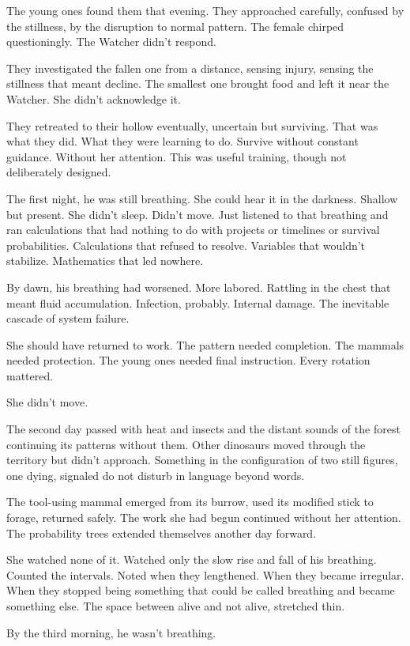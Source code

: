 The young ones found them that evening. They approached carefully, confused by the stillness, by the disruption to normal pattern. The female chirped questioningly. The Watcher didn't respond.

They investigated the fallen one from a distance, sensing injury, sensing the stillness that meant decline. The smallest one brought food and left it near the Watcher. She didn't acknowledge it.

They retreated to their hollow eventually, uncertain but surviving. That was what they did. What they were learning to do. Survive without constant guidance. Without her attention. This was useful training, though not deliberately designed.

The first night, he was still breathing. She could hear it in the darkness. Shallow but present. She didn't sleep. Didn't move. Just listened to that breathing and ran calculations that had nothing to do with projects or timelines or survival probabilities. Calculations that refused to resolve. Variables that wouldn't stabilize. Mathematics that led nowhere.

By dawn, his breathing had worsened. More labored. Rattling in the chest that meant fluid accumulation. Infection, probably. Internal damage. The inevitable cascade of system failure.

She should have returned to work. The pattern needed completion. The mammals needed protection. The young ones needed final instruction. Every rotation mattered.

She didn't move.

The second day passed with heat and insects and the distant sounds of the forest continuing its patterns without them. Other dinosaurs moved through the territory but didn't approach. Something in the configuration of two still figures, one dying, signaled do not disturb in language beyond words.

The tool-using mammal emerged from its burrow, used its modified stick to forage, returned safely. The work she had begun continued without her attention. The probability trees extended themselves another day forward.

She watched none of it. Watched only the slow rise and fall of his breathing. Counted the intervals. Noted when they lengthened. When they became irregular. When they stopped being something that could be called breathing and became something else. The space between alive and not alive, stretched thin.

By the third morning, he wasn't breathing.

